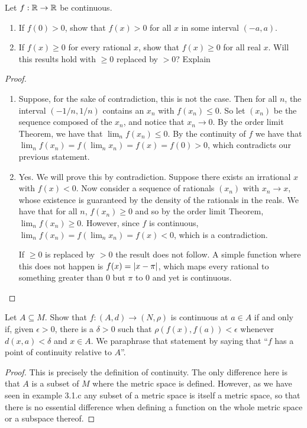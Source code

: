 \begin{exercise}{8}
Let $f:\mathbb{R}\to\mathbb{R}$ be continuous.
\begin{enumerate}
    \item If $f(0)>0$, show that $f(x)>0$ for all $x$ in some interval $(-a,a)$.
    \item If $f(x)\geq 0$ for every rational $x$, show that $f(x)\geq 0$ for all real $x$.
    Will this results hold with $\geq0$ replaced by $>0$? 
    Explain
\end{enumerate}
\end{exercise}
\begin{proof}
\begin{enumerate}
    \item Suppose, for the sake of contradiction, this is not the case.
    Then for all $n$, the interval $(-1/n, 1/n)$ contains an $x_n$ with $f(x_n)\leq 0$.
    So let $(x_n)$ be the sequence composed of the $x_n$, and notice that $x_n \to 0$.
    By the order limit Theorem, we have that $\lim_n f(x_n) \leq 0$.
    By the continuity of $f$ we have that $\lim_n f(x_n) = f(\lim_n x_n) = f(x) = f(0) > 0$,  which contradicts our previous statement.
    \item Yes.
    We will prove this by contradiction.
    Suppose there exists an irrational $x$ with $f(x)<0$.
    Now consider a sequence of rationals $(x_n)$ with $x_n\to x$, whose existence is guaranteed by the density of the rationals in the reals.
    We have that for all $n$, $f(x_n)\geq 0$ and so by the order limit Theorem, $\lim_n f(x_n)\geq 0$.
    However, since $f$ is continuous, $\lim_n f(x_n) = f(\lim_n x_n) = f(x) < 0$, which is a contradiction.

    If $\geq 0$ is replaced by $>0$ the result does not follow. 
    A simple function where this does not happen is $f(x) = \left\lvert x-\pi\right\rvert$, which maps every rational to something greater than 0 but $\pi$ to 0 and yet is continuous.
\end{enumerate}
\end{proof} 

\begin{exercise}{9}
Let $A\subseteq M$.
Show that $f:(A,d)\to (N,\rho)$ is continuous at $a\in A$ if and only if, given $\epsilon>0$, there is a $\delta>0$ such that $\rho(f(x),f(a))<\epsilon$ whenever $d(x,a)<\delta$ and $x\in A$.
We paraphrase that statement by saying that ``$f$ has a point of continuity relative to $A$''.
\end{exercise}
\begin{proof}
This is precisely the definition of continuity.
The only difference here is that $A$ is a subset of $M$ where the metric space is defined.
However, as we have seen in example 3.1.c any subset of a metric space is itself a metric space, so that there is no essential difference when defining a function on the whole metric space or a subspace thereof.
\end{proof} 


